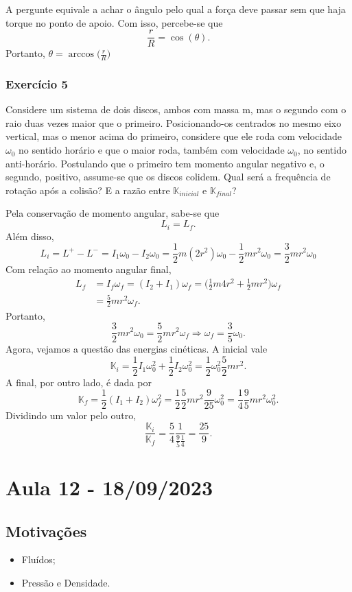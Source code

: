 \documentclass{article}
\begin{document}
A pergunte equivale a achar o ângulo pelo qual a força deve passar sem que haja torque no ponto de apoio. Com isso, percebe-se que 
\[
  \frac{r}{R} = \cos{(\theta )}.
\]
Portanto, \(\theta = \arccos{\biggl(\frac{r}{R}\biggr)}\)
\subsubsection{Exercício 5}
Considere um sistema de dois discos, ambos com massa m, mas o segundo com o raio duas vezes maior que o primeiro. Posicionando-os centrados no mesmo eixo vertical, mas
o menor acima do primeiro, considere que ele roda com velocidade \(\omega_{0}\) no sentido horário e que o maior roda, também com velocidade \(\omega_{0}\), no sentido anti-horário. 
Postulando que o primeiro tem momento angular negativo e, o segundo, positivo, assume-se que os discos colidem. Qual será a frequência de rotação após a colisão?
E a razão entre \(\mathbb{K}_{inicial}\) e \(\mathbb{K}_{final}\)?

Pela conservação de momento angular, sabe-se que 
\[
  L_{i} = L_{f}.
\]
Além disso, 
\[
  L_{i} = L^{+}-L^{-} = I_{1}\omega_{0} - I_{2}\omega_{0} = \frac{1}{2}m(2r^{2})\omega_{0} - \frac{1}{2}mr^{2}\omega_{0} = \frac{3}{2}mr^{2}\omega_{0}
\]
Com relação ao momento angular final, 
\begin{align*}
  L_{f} &= I_{f}\omega_{f} = (I_{2} + I_{1})\omega_{f} = \biggl(\frac{1}{2}m4r^{2}+\frac{1}{2}mr^{2}\biggr)\omega_{f}\\
        &=\frac{5}{2}mr^{2}\omega_{f}.
\end{align*}
Portanto, 
\[
  \frac{3}{2}mr^{2}\omega_{0} = \frac{5}{2}mr^{2}\omega_{f} \Rightarrow \omega_{f}=\frac{3}{5}\omega_{0}.
\]
Agora, vejamos a questão das energias cinéticas. A inicial vale 
\[
  \mathbb{K}_{i} = \frac{1}{2}I_{1}\omega_{0}^{2} + \frac{1}{2}I_{2}\omega_{0}^{2} = \frac{1}{2}\omega_{0}^{2}\frac{5}{2}mr^{2}. 
\]
A final, por outro lado, é dada por 
\[
  \mathbb{K}_{f} = \frac{1}{2}(I_{1}+I_{2})\omega_{f}^{2} = \frac{1}{2}\frac{5}{2}mr^{2}\frac{9}{25}\omega_{0}^{2} = \frac{1}{4}\frac{9}{5}mr^{2}\omega_{0}^{2}.
\]
Dividindo um valor pelo outro, 
\[
  \frac{\mathbb{K}_{i}}{\mathbb{K}_{f}} = \frac{5}{4}\frac{1}{\frac{9}{5}\frac{1}{4}} = \frac{25}{9}.
\]
\newpage

\section{Aula 12 - 18/09/2023}
\subsection{Motivações}
\begin{itemize}
  \item Fluídos;
  \item Pressão e Densidade.
\end{itemize}
\end{document}

